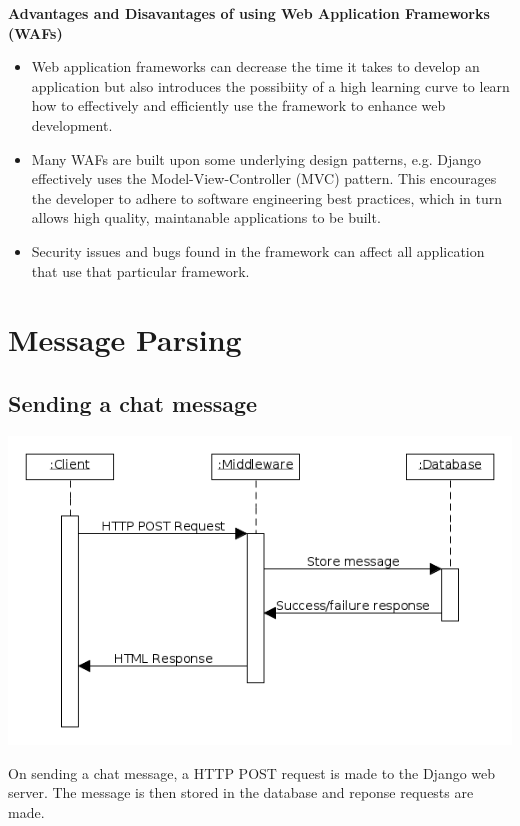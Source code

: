 \documentclass{sig-alt-release2}
\begin{document}
\textbf{Advantages and Disavantages of using Web Application Frameworks (WAFs)}
\begin{itemize}
\item Web application frameworks can decrease the time it takes to develop an application but also introduces the possibiity of a high learning curve to learn how to effectively and efficiently use the framework to enhance web development.
\item Many WAFs are built upon some underlying design patterns, e.g. Django effectively uses the Model-View-Controller (MVC) pattern. This encourages the developer to adhere to software engineering best practices, which in turn allows high quality, maintanable applications to be built.
\item Security issues and bugs found in the framework can affect all application that use that particular framework.
\end{itemize}

\section{Message Parsing}
\subsection{Sending a chat message}
\includegraphics[scale=0.4]{postmessage.png}

On sending a chat message, a HTTP POST request is made to the Django web server. The message is then stored in the database and reponse requests are made.
\end{document}
